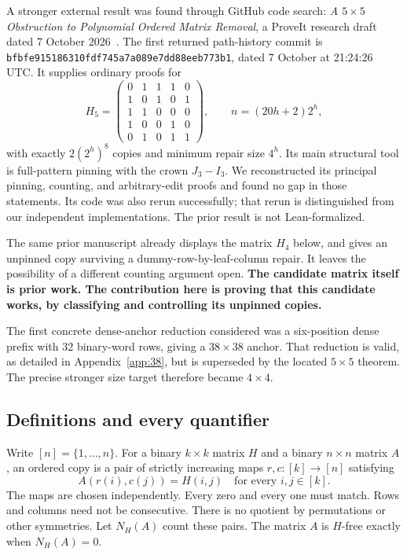 \documentclass[11pt,a4paper]{article}
\theoremstyle{remark}
\newcommand{\Hfour}{H_4}
\begin{document}
A stronger external result was found through GitHub code search:
\emph{A \(5\times5\) Obstruction to Polynomial Ordered Matrix Removal},
a ProveIt research draft dated 7 October 2026~\cite{proveit}.
The first returned path-history commit is
\texttt{bfbfe915186310fdf745a7a089e7dd88eeb773b1},
dated 7 October at 21:24:26 UTC. It supplies ordinary proofs for
\[
H_5=
\begin{pmatrix}
0&1&1&1&0\\
1&0&1&0&1\\
1&1&0&0&0\\
1&0&0&1&0\\
0&1&0&1&1
\end{pmatrix},
\qquad n=(20h+2)2^h,
\]
with exactly \(2(2^h)^8\) copies and minimum repair size \(4^h\).
Its main structural tool is full-pattern pinning with the crown
\(J_3-I_3\). We reconstructed its principal pinning, counting, and
arbitrary-edit proofs and found no gap in those statements. Its code was
also rerun successfully; that rerun is distinguished from our independent
implementations. The prior result is not Lean-formalized.

The same prior manuscript already displays the matrix \(\Hfour\) below,
and gives an unpinned copy surviving a dummy-row-by-leaf-column repair.
It leaves the possibility of a different counting argument open.
\textbf{The candidate matrix itself is prior work. The contribution here
is proving that this candidate works, by classifying and controlling its
unpinned copies.}

The first concrete dense-anchor reduction considered was a six-position
dense prefix with 32 binary-word rows, giving a \(38\times38\) anchor.
That reduction is valid, as detailed in Appendix~\ref{app:38}, but is
superseded by the located \(5\times5\) theorem. The precise stronger size
target therefore became \(4\times4\).

\subsection{Definitions and every quantifier}
Write \([n]=\{1,\ldots,n\}\). For a binary \(k\times k\) matrix \(H\)
and a binary \(n\times n\) matrix \(A\), an ordered copy is a pair of
strictly increasing maps \(r,c:[k]\to[n]\) satisfying
\[
A(r(i),c(j))=H(i,j)\quad\text{for every }i,j\in[k].
\]
The maps are chosen independently. Every zero and every one must match.
Rows and columns need not be consecutive. There is no quotient by
permutations or other symmetries. Let \(N_H(A)\) count these pairs.
The matrix \(A\) is \(H\)-free exactly when \(N_H(A)=0\).
\end{document}
